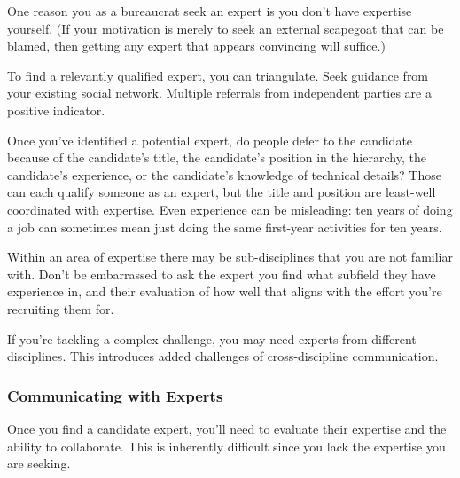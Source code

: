 One reason you as a bureaucrat seek an expert is you don't have expertise yourself. (If your motivation is merely to seek an external scapegoat that can be blamed, then getting any expert that appears convincing will suffice.)

To find a relevantly qualified expert, you can triangulate. 
Seek guidance from your existing social network. Multiple referrals from independent parties are a positive indicator. 

Once you've identified a potential expert, do people defer to the candidate because of the candidate's title, the candidate's position in the hierarchy, the candidate's experience, or the candidate's knowledge of technical details? Those can each qualify someone as an expert, but the title and position are least-well coordinated with expertise. Even experience can be misleading: ten years of doing a job can sometimes mean just doing the same first-year activities for ten years. %

Within an area of expertise there may be sub-disciplines that you are not familiar with. Don't be embarrassed to ask the expert you find what subfield they have experience in, and their evaluation of how well that aligns with the effort you're recruiting them for.

If you're tackling a complex challenge, you may need experts from different disciplines. This introduces added challenges of cross-discipline communication. 





\subsubsection*{Communicating with Experts}
Once you find a candidate expert, you'll need to evaluate their expertise and the ability to collaborate. This is inherently difficult since you lack the expertise you are seeking. 

